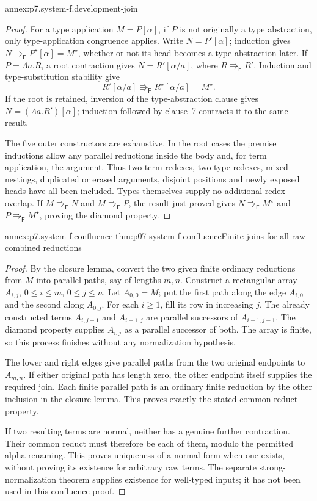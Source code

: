 \begin{annexitem}{annex:p7.system-f.development-join}
\begin{proof}
For a type application \(M=P[\alpha]\), if \(P\) is not originally
a type abstraction, only type-application congruence applies. Write
\(N=P'[\alpha]\); induction gives
\(N\Rrightarrow_{\mathsf F}P^\star[\alpha]=M^\star\), whether
or not its head becomes a type abstraction later.
If \(P=\Lambda a.R\), a root contraction gives
\(N=R'[\alpha/a]\), where \(R\Rrightarrow_{\mathsf F}R'\).
Induction and type-substitution stability give
\[
 R'[\alpha/a]\Rrightarrow_{\mathsf F}R^\star[\alpha/a]=M^\star.
\]
If the root is retained, inversion of the type-abstraction clause gives
\(N=(\Lambda a.R')[\alpha]\); induction followed by clause~7
contracts it to the same result.

The five outer constructors are exhaustive. In the root cases the premise
inductions allow any parallel reductions inside the body and, for term
application, the argument. Thus two term redexes, two type redexes, mixed
nestings, duplicated or erased arguments, disjoint positions and newly
exposed heads have all been included. Types themselves supply no additional
redex overlap. If \(M\Rrightarrow_{\mathsf F}N\) and
\(M\Rrightarrow_{\mathsf F}P\), the result just proved gives
\(N\Rrightarrow_{\mathsf F}M^\star\) and
\(P\Rrightarrow_{\mathsf F}M^\star\), proving the diamond property.
\end{proof}
\end{annexitem}

\begin{annexitem}{annex:p7.system-f.confluence}
 {thm:p07-system-f-confluence}{Finite joins for all raw combined reductions}
\begin{proof}
By the closure lemma, convert the two given finite ordinary reductions
from \(M\) into parallel paths, say of lengths \(m,n\). Construct
a rectangular array \(A_{i,j}\), \(0\leq i\leq m\),
\(0\leq j\leq n\). Let \(A_{0,0}=M\); put the first path along
the edge \(A_{i,0}\) and the second along \(A_{0,j}\).
For each \(i\geq1\), fill its row in increasing \(j\). The
already constructed terms \(A_{i,j-1}\) and \(A_{i-1,j}\) are
parallel successors of \(A_{i-1,j-1}\). The diamond property supplies
\(A_{i,j}\) as a parallel successor of both. The array is finite,
so this process finishes without any normalization hypothesis.

The lower and right edges give parallel paths from the two original
endpoints to \(A_{m,n}\). If either original path has length zero,
the other endpoint itself supplies the required join. Each finite parallel
path is an ordinary finite reduction by the other inclusion in the
closure lemma. This proves exactly the stated common-reduct property.

If two resulting terms are normal, neither has a genuine further
contraction. Their common reduct must therefore be each of them, modulo
the permitted alpha-renaming. This proves uniqueness of a normal form
when one exists, without proving its existence for arbitrary raw terms.
The separate strong-normalization theorem supplies existence for well-typed
inputs; it has not been used in this confluence proof.
\end{proof}
\end{annexitem}

